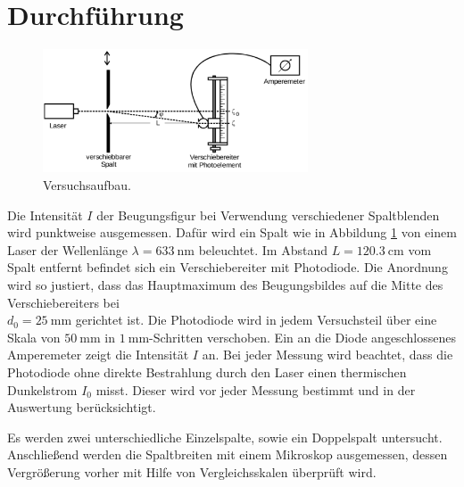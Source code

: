 \section{Durchführung}
\label{sec:Durchfuehrung}

\begin{figure}
	\centering
	\includegraphics[width=0.7\textwidth]{Bilder/Aufbau.pdf}
	\caption{Versuchsaufbau.\cite{V406}}
	\label{fig:aufbau}
\end{figure}

Die Intensität $I$ der Beugungsfigur bei Verwendung verschiedener Spaltblenden wird punktweise ausgemessen. 
Dafür wird ein Spalt wie in Abbildung \ref{fig:aufbau} von einem Laser der Wellenlänge $\lambda=\SI{633}{\nano\meter}$ beleuchtet. 
Im Abstand $L=\SI{120.3}{\centi\meter}$ vom Spalt entfernt befindet sich ein Verschiebereiter mit Photodiode. 
Die Anordnung wird so justiert, dass das Hauptmaximum des Beugungsbildes auf die Mitte des Verschiebereiters bei \\$d_0=\SI{25}{\milli\meter}$ gerichtet ist. 
Die Photodiode wird in jedem Versuchsteil über eine Skala von $\SI{50}{\milli\meter}$ in $\SI{1}{\milli\meter}$-Schritten verschoben.
Ein an die Diode angeschlossenes Amperemeter zeigt die Intensität $I$ an. 
Bei jeder Messung wird beachtet, dass die Photodiode ohne direkte Bestrahlung durch den Laser einen thermischen Dunkelstrom $I_0$ misst. Dieser wird vor jeder Messung bestimmt und in der Auswertung berücksichtigt. 

Es werden zwei unterschiedliche Einzelspalte, sowie ein Doppelspalt untersucht. 
Anschließend werden die Spaltbreiten mit einem Mikroskop ausgemessen, dessen Vergrößerung vorher mit Hilfe von Vergleichsskalen überprüft wird. 
\newpage


